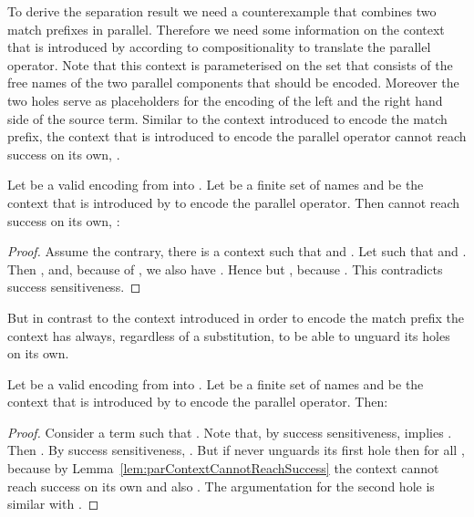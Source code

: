 \documentclass[]{article}
\begin{document}
To derive the separation result we need a counterexample that combines two match prefixes in parallel.
Therefore we need some information on the context  that is introduced by  according to compositionality to translate the parallel operator. Note that this context is parameterised on the set  that consists of the free names of the two parallel components that should be encoded. Moreover the two holes serve as placeholders for the encoding of the left and the right hand side of the source term.
Similar to the context introduced to encode the match prefix, the context that is introduced to encode the parallel operator cannot reach success on its own, \ie .

\begin{lemma}
	\label{lem:parContextCannotReachSuccess}
	Let \encod be a valid encoding from \piT into \piNM.
	Let  be a finite set of names
	and  be the context that is introduced by  to encode the parallel operator.
	Then  cannot reach success on its own, \ie:
	
\end{lemma}

\begin{proof}
	Assume the contrary, \ie there is a context  such that  and . Let  such that  and . Then ,  and, because of , we also have . Hence  but , because . This contradicts success sensitiveness.
\end{proof}

But in contrast to the context introduced in order to encode the match prefix the context  has always, \ie regardless of a substitution, to be able to unguard its holes on its own.

\begin{lemma}
	\label{lem:parContextUnguard}
	Let \encod be a valid encoding from \piT into \piNM.
	Let  be a finite set of names
	and  be the context that is introduced by  to encode the parallel operator.
	Then:
	
\end{lemma}

\begin{proof}
	Consider a term  such that .
	Note that, by success sensitiveness,  implies .
	Then .
	By success sensitiveness, .
	But if  never unguards its first hole then  for all , because by Lemma~\ref{lem:parContextCannotReachSuccess} the context cannot reach success on its own and also . The argumentation for the second hole is similar with .
\end{proof}
\end{document}
